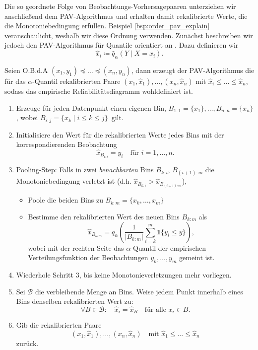 Die so geordnete Folge von Beobachtungs-Vorhersagepaaren unterziehen wir anschließend dem PAV-Algorithmus und erhalten damit rekalibrierte Werte, die die Monotoniebedingung erfüllen. Beispiel \ref{bsp:order_pav_explain} veranschaulicht, weshalb wir diese Ordnung verwenden. Zunächst beschreiben wir jedoch den PAV-Algorithmus für Quantile orientiert an \textcite[Algorithm 1]{gneiting2023regression}. Dazu definieren wir
\[
\hat{x}_i \coloneqq \hat{q}_\alpha(Y \mid X = x_i).
\]
\begin{alg} \label{alq:pava}
Seien O.B.d.A $(x_1,y_1) \preceq \dotsc \preceq (x_n,y_n)$, dann erzeugt der PAV-Algorithmus die für das $\alpha$-Quantil rekalibrierten Paare 
        $(x_1,\hat x_1), \dotsc, (x_n,\hat x_n)$  mit  $\hat x_i \le \dotsc \le \hat x_n$, sodass das empirische Reliabilitätsdiagramm wohldefiniert ist.
\begin{enumerate}
    \item Erzeuge für jeden Datenpunkt einen eigenen Bin, $B_{1:1}=\{x_1\}, \dots,B_{n:n}=\{x_n\}$,
    wobei $B_{i:j}=\{x_k \mid i\leq k \leq j \}\,$ gilt.
    \item Initialisiere den Wert für die rekalibrierten Werte jedes Bins mit der korrespondierenden Beobachtung 
    \[
    \hat x_{B_{i:i}}=y_i \quad \text{für } i=1,\dotsc,n.
    \]  
    \item Pooling-Step: Falls in zwei \emph{benachbarten} Bins $B_{k:i}$, $B_{(i+1):m}$ die Monotoniebedingung verletzt ist (d.h. $\hat x_{B_{k:i}} > \hat x_{B_{(i+1):m}}$),
    \begin{itemize}
        \item Poole die beiden Bins zu $B_{k:m}=\{x_k, \dotsc, x_m\}$
        \item Bestimme den rekalibrierten Wert des neuen Bins $B_{k:m}$ als 
        \[
            \hat x_{B_{k:m}}= q_\alpha\left(\frac{1}{\left| B_{k:m} \right|}\sum_{i=k}^m \mathds{1}\{y_i\leq y\}\right),
        \]
        wobei mit der rechten Seite das $\alpha$-Quantil der empirischen Verteilungsfunktion der Beobachtungen $y_k,\dotsc,y_m$ gemeint ist.
    \end{itemize}{}
    \item Wiederhole Schritt 3, bis keine Monotonieverletzungen mehr vorliegen.
    \item Sei $\mathcal{B}$ die verbleibende Menge an Bins. Weise jedem Punkt innerhalb eines Bins denselben rekalibrierten Wert zu:
    \[
    \forall B \in \mathcal{B}: \quad \hat x_i = \hat x_B \quad \text{für alle } x_i \in B.
     \]
    \item Gib die rekalibrierten Paare 
    \[
        (x_1,\hat x_1), \dotsc, (x_n,\hat x_n) \quad \text{mit }  \hat x_1 \le \dotsc \le \hat x_n
    \]
    zurück.
\end{enumerate}
\end{alg}

